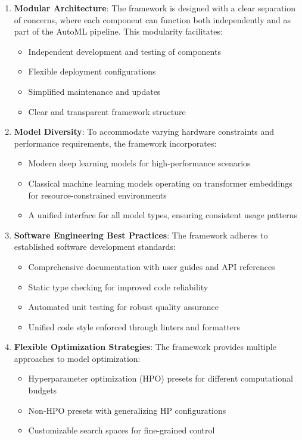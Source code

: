\begin{enumerate}
    \item \textbf{Modular Architecture}: The framework is designed with a clear separation of concerns, where each component can function both independently and as part of the AutoML pipeline. This modularity facilitates:
    \begin{itemize}
        \item Independent development and testing of components
        \item Flexible deployment configurations
        \item Simplified maintenance and updates
        \item Clear and transparent framework structure
    \end{itemize}

    \item \textbf{Model Diversity}: To accommodate varying hardware constraints and performance requirements, the framework incorporates:
    \begin{itemize}
        \item Modern deep learning models for high-performance scenarios
        \item Classical machine learning models operating on transformer embeddings for resource-constrained environments
        \item A unified interface for all model types, ensuring consistent usage patterns
    \end{itemize}

    \item \textbf{Software Engineering Best Practices}: The framework adheres to established software development standards:
    \begin{itemize}
        \item Comprehensive documentation with user guides and API references
        \item Static type checking for improved code reliability
        \item Automated unit testing for robust quality assurance
        \item Unified code style enforced through linters and formatters
    \end{itemize}

    \item \textbf{Flexible Optimization Strategies}: The framework provides multiple approaches to model optimization:
    \begin{itemize}
        \item Hyperparameter optimization (HPO) presets for different computational budgets
        \item Non-HPO presets with generalizing HP configurations 
        \item Customizable search spaces for fine-grained control
    \end{itemize}


\end{enumerate}
